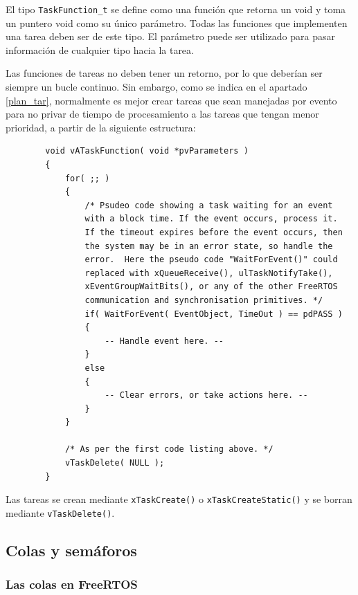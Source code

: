     El tipo \texttt{TaskFunction\_t} se define como una función que retorna un void y toma un puntero void como su único parámetro. Todas las funciones que implementen una tarea deben ser de este tipo. El parámetro puede ser utilizado para pasar información de cualquier tipo hacia la tarea.
    
    Las funciones de tareas no deben tener un retorno, por lo que deberían ser siempre un bucle continuo. Sin embargo, como se indica en el apartado \ref{plan_tar}, normalmente es mejor crear tareas que sean manejadas por evento para no privar de tiempo de procesamiento a las tareas que tengan menor prioridad, a partir de la siguiente estructura:
    
    \begin{verbatim}
        void vATaskFunction( void *pvParameters )
        {
            for( ;; )
            {
                /* Psudeo code showing a task waiting for an event 
                with a block time. If the event occurs, process it.  
                If the timeout expires before the event occurs, then 
                the system may be in an error state, so handle the
                error.  Here the pseudo code "WaitForEvent()" could 
                replaced with xQueueReceive(), ulTaskNotifyTake(), 
                xEventGroupWaitBits(), or any of the other FreeRTOS 
                communication and synchronisation primitives. */
                if( WaitForEvent( EventObject, TimeOut ) == pdPASS )
                {
                    -- Handle event here. --
                }
                else
                {
                    -- Clear errors, or take actions here. --
                }
            }
    
            /* As per the first code listing above. */
            vTaskDelete( NULL );
        }
    \end{verbatim}
    
    Las tareas se crean mediante \texttt{xTaskCreate()} o \texttt{xTaskCreateStatic()} y se borran mediante \texttt{vTaskDelete()}.

\subsection{Colas y semáforos}

\subsubsection{Las colas en FreeRTOS}

